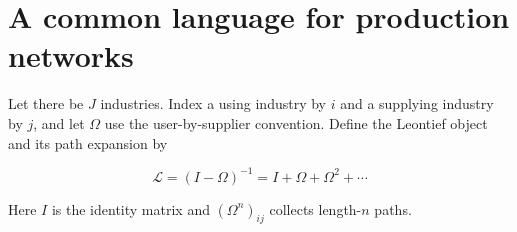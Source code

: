 \documentclass{article}
\begin{document}
\section{A common language for production networks}

Let there be $J$ industries. Index a using industry by $i$ and a supplying
industry by $j$, and let $\Omega$ use the user-by-supplier convention. Define
the Leontief object and its path expansion by

\begin{equation}
  \mathcal{L}=(I-\Omega)^{-1}=I+\Omega+\Omega^2+\cdots
  \label{eq:leontief}
\end{equation}

Here $I$ is the identity matrix and $(\Omega^n)_{ij}$ collects length-$n$ paths.
\end{document}
